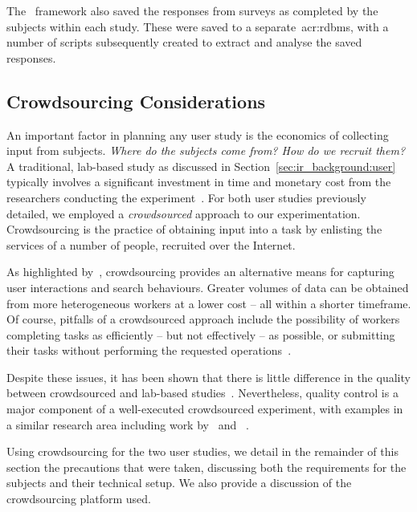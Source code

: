 The \treconomics~framework also saved the responses from surveys as completed by the subjects within each study. These were saved to a separate~\gls{acr:rdbms}, with a number of scripts subsequently created to extract and analyse the saved responses.

\subsection{Crowdsourcing Considerations}\label{sec:methodology:user:crowdsourcing}
An important factor in planning any user study is the economics of collecting input from subjects. \emph{Where do the subjects come from? How do we recruit them?} A traditional, lab-based study as discussed in Section~\ref{sec:ir_background:user} typically involves a significant investment in time and monetary cost from the researchers conducting the experiment~\citep{spool2001testing}. For both user studies previously detailed, we employed a \emph{crowdsourced} approach to our experimentation. Crowdsourcing is the practice of obtaining input into a task by enlisting the services of a number of people, recruited over the Internet.

As highlighted by~\cite{zuccon2013crowdsourcing_comparisons}, crowdsourcing provides an alternative means for capturing user interactions and search behaviours. Greater volumes of data can be obtained from more heterogeneous workers at a lower cost -- all within a shorter timeframe. Of course, pitfalls of a crowdsourced approach include the possibility of workers completing tasks as efficiently -- but not effectively -- as possible, or submitting their tasks without performing the requested operations~\citep{feild2010turkers}.

Despite these issues, it has been shown that there is little difference in the quality between crowdsourced and lab-based studies~\citep{kely2011user_study, zuccon2013crowdsourcing_comparisons}. Nevertheless, quality control is a major component of a well-executed crowdsourced experiment, with examples in a similar research area including work by~\cite{kazai2011crowdsourced} and ~\cite{crescenzi2013crowdsourced}.

Using crowdsourcing for the two user studies, we detail in the remainder of this section the precautions that were taken, discussing both the requirements for the subjects and their technical setup. We also provide a discussion of the crowdsourcing platform used.

